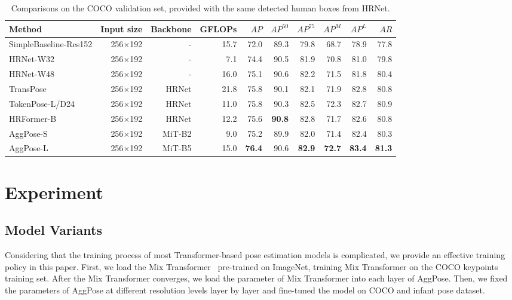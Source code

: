 \documentclass{article}
\begin{document}
\begin{table*}
\centering
\begin{tabular}{lrrrrrrrrr}
\toprule
Method    & Input size  & Backbone    & GFLOPs    & $AP$  & $AP^{50}$ & $AP^{75}$ & $AP^{M}$ & $AP^{L}$   & $AR$ \\
\midrule
SimpleBaseline-Res152   & 256$\times$192    & -  & 15.7  & 72.0  &  89.3  & 79.8  &  68.7  & 78.9  & 77.8   \\
HRNet-W32~\cite{wang2020deep}   & 256$\times$192    & -  & 7.1  & 74.4  &  90.5  &  81.9  & 70.8   & 81.0  &  79.8   \\
HRNet-W48~\cite{wang2020deep}   & 256$\times$192    & -  & 16.0  &  75.1  &  90.6  &  82.2  &  71.5  &  81.8  &  80.4     \\
TransPose~\cite{yang2021transpose}  & 256$\times$192  & HRNet   & 21.8    & 75.8 & 90.1  & 82.1  & 71.9  & 82.8  & 80.8      \\
TokenPose-L/D24~\cite{li2021tokenpose}  & 256$\times$192    & HRNet  & 11.0  & 75.8  & 90.3 &  82.5  & 72.3  &  82.7  & 80.9   \\
HRFormer-B~\cite{yuan2021hrformer}  & 256$\times$192    & HRNet  & 12.2  & 75.6  & \textbf{90.8}  & 82.8  & 71.7  & 82.6  & 80.8    \\
AggPose-S  & 256$\times$192 & MiT-B2  & 9.0   & 75.2  & 89.9  &  82.0  &  71.4  &  82.4   &  80.3     \\
AggPose-L  & 256$\times$192 & MiT-B5  & 15.0    & \textbf{76.4}  & 90.6  & \textbf{82.9}  & \textbf{72.7}   & \textbf{83.4}   & \textbf{81.3}\\
\bottomrule
\end{tabular}
\caption{Comparisons on the COCO validation set, provided with the same detected human boxes from HRNet.}
\label{tab:COCO_comparison}
\end{table*}

\section{Experiment}

\subsection{Model Variants}

Considering that the training process of most Transformer-based pose estimation models is complicated, we provide an effective training policy in this paper. First, we load the Mix Transformer~\cite{xie2021segformer} pre-trained on ImageNet, training Mix Transformer on the COCO keypoints training set. After the Mix Transformer converges, we load the parameter of Mix Transformer into each layer of AggPose. Then, we fixed the parameters of AggPose at different resolution levels layer by layer and fine-tuned the model on COCO and infant pose dataset. 
\end{document}
